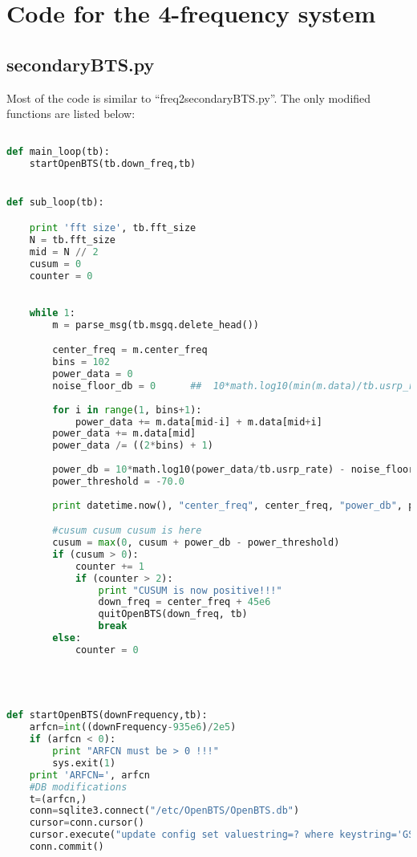 \section{Code for the 4-frequency system}
\subsection{secondaryBTS.py}

Most of the code is similar to ``freq2secondaryBTS.py''. The only modified 
functions are listed below:

\begin{lstlisting}[language=Python]

def main_loop(tb):
    startOpenBTS(tb.down_freq,tb)


def sub_loop(tb):

    print 'fft size', tb.fft_size
    N = tb.fft_size
    mid = N // 2
    cusum = 0
    counter = 0
    

    while 1:
        m = parse_msg(tb.msgq.delete_head())

        center_freq = m.center_freq
        bins = 102
        power_data = 0
        noise_floor_db = 0      ##  10*math.log10(min(m.data)/tb.usrp_rate)
        
        for i in range(1, bins+1):
            power_data += m.data[mid-i] + m.data[mid+i]
        power_data += m.data[mid]
        power_data /= ((2*bins) + 1)
        
        power_db = 10*math.log10(power_data/tb.usrp_rate) - noise_floor_db
        power_threshold = -70.0
        
        print datetime.now(), "center_freq", center_freq, "power_db", power_db

        #cusum cusum cusum is here
        cusum = max(0, cusum + power_db - power_threshold)
        if (cusum > 0):
            counter += 1
            if (counter > 2):
                print "CUSUM is now positive!!!"
                down_freq = center_freq + 45e6
                quitOpenBTS(down_freq, tb)
                break
        else:
            counter = 0




def startOpenBTS(downFrequency,tb):
    arfcn=int((downFrequency-935e6)/2e5)
    if (arfcn < 0):
        print "ARFCN must be > 0 !!!"
        sys.exit(1)
    print 'ARFCN=', arfcn
    #DB modifications
    t=(arfcn,)
    conn=sqlite3.connect("/etc/OpenBTS/OpenBTS.db")
    cursor=conn.cursor()
    cursor.execute("update config set valuestring=? where keystring='GSM.Radio.C0'",t)
    conn.commit()


\end{lstlisting}
